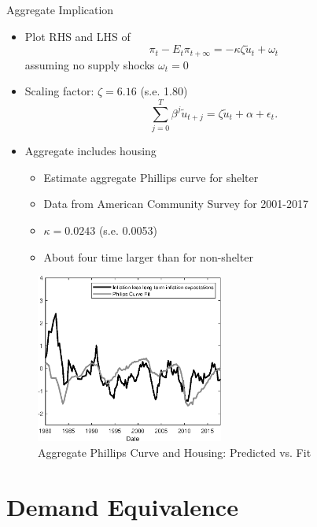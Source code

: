 \documentclass[english,xcolor=svgnames]{beamer}
\begin{document}
\begin{frame}{Aggregate Implication}\label{agg_impl}
	\begin{itemize}
		\itemsep1em 
		\item Plot RHS and LHS of
		\[ \pi_{t} - E_{t}\pi_{t+\infty} =-\kappa \zeta \tilde{u}_{t} + \omega_t\]
		assuming no supply shocks $\omega_t = 0$
		\item Scaling factor: $\zeta = 6.16$ (s.e. 1.80)
		\[\sum_{j=0}^{T} \beta^j \tilde{u}_{t+j} = \zeta \tilde{u}_{t} + \alpha + \epsilon_{t}. \]
		\item Aggregate includes housing 
		\begin{itemize}
			\item Estimate aggregate Phillips curve for shelter
			\item Data from American Community Survey for 2001-2017
			\item $\kappa = 0.0243$ (s.e. 0.0053) \hyperlink{shelter}{}
			\item About four time larger than for non-shelter
		\end{itemize}
	\end{itemize}
\end{frame}



\begin{frame}[label=flatflatter]
	\vspace{30pt}
	\begin{figure}[t]
		\centering
		\includegraphics[width = 0.55\textwidth]{figures/fit_pc_ppt_housing.eps}
		\caption{Aggregate Phillips Curve and Housing: Predicted vs. Fit}
	\end{figure}
\end{frame}


\section{Demand Equivalence}
\end{document}
